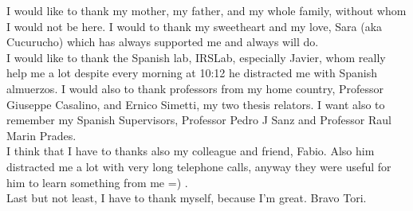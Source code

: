 

\begin{acknowledgements}

I would like to thank my mother, my father, and my whole family, without whom I would not be here. I would to thank my sweetheart and my love, Sara (aka Cucurucho) which has always supported me and always will do.\\
I would like to thank the Spanish lab, IRSLab, especially Javier, whom really help me a lot despite every morning at 10:12 he distracted me with Spanish almuerzos. I would also to thank professors from my home country, Professor Giuseppe Casalino, and Ernico Simetti, my two thesis relators. I want also to remember my Spanish Supervisors, Professor Pedro J Sanz and Professor Raul Marin Prades.\\
I think that I have to thanks also my colleague and friend, Fabio. Also him distracted me a lot with very long telephone calls, anyway they were useful for him to learn something from me =) .\\
Last but not least, I have to thank myself, because I'm great. Bravo Tori.


\end{acknowledgements}
